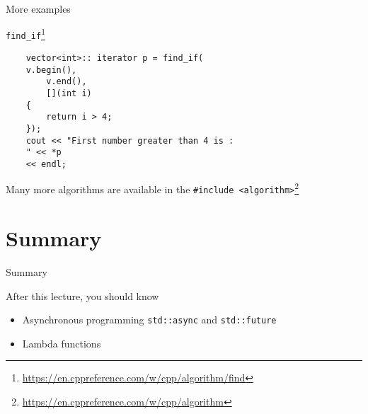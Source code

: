 \documentclass[12pt,t]{beamer}
\begin{document}
\begin{frame}[fragile]{More examples}

\begin{block}{\lstinline|find_if|\footnote{\tiny\url{https://en.cppreference.com/w/cpp/algorithm/find}}}
\begin{lstlisting}
    vector<int>:: iterator p = find_if(
    v.begin(), 
    	v.end(), 
    	[](int i) 
    { 
        return i > 4; 
    }); 
    cout << "First number greater than 4 is : 
    " << *p 
    << endl;
\end{lstlisting}
\end{block}
Many more algorithms are available in the \lstinline|#include <algorithm>|\footnote{\tiny\url{https://en.cppreference.com/w/cpp/algorithm}}
\end{frame}
     


\section{Summary}
\begin{frame}{Summary}
\begin{block}{After this lecture, you should know}
\begin{itemize}
\item Asynchronous programming \lstinline|std::async| and \lstinline|std::future|
\item Lambda functions
\end{itemize}
\end{block}
\end{frame}
\end{document}
